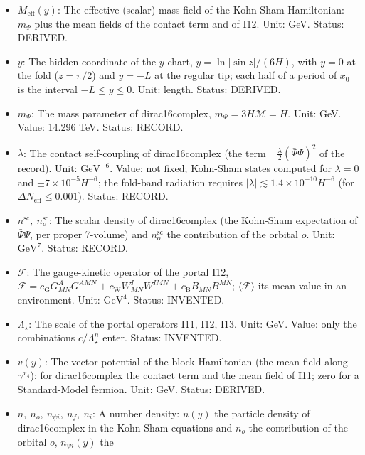 \documentclass[
  10pt,
]{article}
\providecommand{\tightlist}{%
  \setlength{\itemsep}{0pt}\setlength{\parskip}{0pt}}
\begin{document}
\begin{itemize}
\tightlist
\item
  \(M_{\mathrm{eff}}(y)\): The effective (scalar) mass field of the
  Kohn-Sham Hamiltonian: \(m_\Psi\) plus the mean fields of the contact
  term and of I12. Unit: GeV. Status: DERIVED.
\item
  \(y\): The hidden coordinate of the \(y\) chart,
  \(y = \ln\lvert\sin z\rvert/(6H)\), with \(y = 0\) at the fold
  (\(z = \pi/2\)) and \(y = -L\) at the regular tip; each half of a
  period of \(x_0\) is the interval \(-L \le y \le 0\). Unit: length.
  Status: DERIVED.
\item
  \(m_\Psi\): The mass parameter of dirac16complex,
  \(m_\Psi = 3H\mathcal{M} = H\). Unit: GeV. Value: 14.296 TeV. Status:
  RECORD.
\item
  \(\lambda\): The contact self-coupling of dirac16complex (the term
  \(-\frac{\lambda}{2}(\bar\Psi\Psi)^2\) of the record). Unit:
  \(\mathrm{GeV}^{-6}\). Value: not fixed; Kohn-Sham states computed for
  \(\lambda = 0\) and \(\pm7\times10^{-5}H^{-6}\); the fold-band
  radiation requires
  \(\lvert\lambda\rvert \lesssim 1.4\times10^{-10}H^{-6}\) (for
  \(\Delta N_{\mathrm{eff}} \le 0.001\)). Status: RECORD.
\item
  \(n^{\mathrm{sc}},\ n^{\mathrm{sc}}_o\): The scalar density of
  dirac16complex (the Kohn-Sham expectation of \(\bar\Psi\Psi\), per
  proper 7-volume) and \(n^{\mathrm{sc}}_o\) the contribution of the
  orbital \(o\). Unit: \(\mathrm{GeV}^{7}\). Status: RECORD.
\item
  \(\mathcal{F}\): The gauge-kinetic operator of the portal I12,
  \(\mathcal{F} = c_{\mathrm{G}}G^A_{MN}G^{AMN} + c_{\mathrm{W}}W^I_{MN}W^{IMN} + c_{\mathrm{B}}B_{MN}B^{MN}\);
  \(\langle\mathcal{F}\rangle\) its mean value in an environment. Unit:
  \(\mathrm{GeV}^{4}\). Status: INVENTED.
\item
  \(\Lambda_\star\): The scale of the portal operators I11, I12, I13.
  Unit: GeV. Value: only the combinations \(c/\Lambda_\star^n\) enter.
  Status: INVENTED.
\item
  \(v(y)\): The vector potential of the block Hamiltonian (the mean
  field along \(\gamma^{x_4}\)): for dirac16complex the contact term and
  the mean field of I11; zero for a Standard-Model fermion. Unit: GeV.
  Status: DERIVED.
\item
  \(n,\ n_o,\ n_{\psi i},\ n_f,\ n_i\): A number density: \(n(y)\) the
  particle density of dirac16complex in the Kohn-Sham equations and
  \(n_o\) the contribution of the orbital \(o\), \(n_{\psi i}(y)\) the

\end{itemize}
\end{document}
